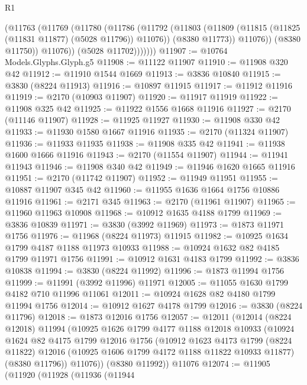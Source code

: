 \begin{lexlean}{R1}
\begin{coremodule}
                (@11763
                  (@11769
                    (@11780
                      (@11786
                        (@11792
                          (@11803
                            (@11809 (@11815 (@11825 (@11831 @11877) (@5028 @11796)) @11076))
                            (@8380 @11773))
                          @11076))
                      (@8380 @11750))
                    @11076))
                (@5028 @11702)))))))
@11907 := @10764 Models.Glyphs.Glyph.g5
@11908 := @11122 @11907
@11910 := @11908 @320 @42
@11912 := @11910 @1544 @1669
@11913 := @3836 @10840
@11915 := @3830 (@8224 @11913)
@11916 := @10897 @11915
@11917 := @11912 @11916
@11919 := @2170 (@10903 @11907)
@11920 := @11917 @11919
@11922 := @11908 @325 @42
@11925 := @11922 @1556 @1668 @11916
@11927 := @2170 (@11146 @11907)
@11928 := @11925 @11927
@11930 := @11908 @330 @42
@11933 := @11930 @1580 @1667 @11916
@11935 := @2170 (@11324 @11907)
@11936 := @11933 @11935
@11938 := @11908 @335 @42
@11941 := @11938 @1600 @1666 @11916
@11943 := @2170 (@11554 @11907)
@11944 := @11941 @11943
@11946 := @11908 @340 @42
@11949 := @11946 @1620 @1665 @11916
@11951 := @2170 (@11742 @11907)
@11952 := @11949 @11951
@11955 := @10887 @11907 @345 @42
@11960 := @11955 @1636 @1664 @1756 @10886 @11916
@11961 := @2171 @345
@11963 := @2170 (@11961 @11907)
@11965 := @11960 @11963 @10908
@11968 := @10912 @1635 @4188 @1799
@11969 := @3836 @10839
@11971 := @3830 (@3992 @11969)
@11973 := @1873 @11971 @1756
@11976 := @11968 (@8224 @11973) @11915
@11982 := @10925 @1634 @1799 @4187 @1188 @11973 @10933
@11988 := @10924 @1632 @82 @4185 @1799 @11971 @1756
@11991 := @10912 @1631 @4183 @1799
@11992 := @3836 @10838
@11994 := @3830 (@8224 @11992)
@11996 := @1873 @11994 @1756
@11999 := @11991 (@3992 @11996) @11971
@12005 := @11055 @1630 @1799 @4182 @710 @11996 @11061
@12011 := @10924 @1628 @82 @4180 @1799 @11994 @1756
@12014 := @10912 @1627 @4178 @1799
@12016 := @3830 (@8224 @11796)
@12018 := @1873 @12016 @1756
@12057 := @12011
    (@12014
      (@8224 @12018)
      @11994
      (@10925
        @1626
        @1799
        @4177
        @1188
        @12018
        @10933
        (@10924
          @1624
          @82
          @4175
          @1799
          @12016
          @1756
          (@10912
            @1623
            @4173
            @1799
            (@8224 @11822)
            @12016
            (@10925 @1606 @1799 @4172 @1188 @11822 @10933 @11877)
            (@8380 @11796))
          @11076))
      (@8380 @11992))
    @11076
@12074 := @11905
    (@11920
      (@11928
        (@11936
          (@11944

\end{coremodule}
\end{lexlean}
